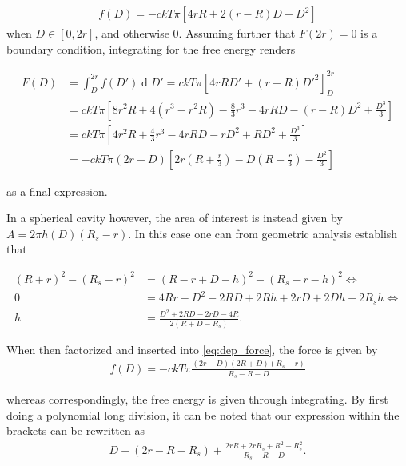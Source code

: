 \documentclass[a4paper,12pt]{article}
\renewcommand{\d}[1]{\ensuremath{\operatorname{d}\!{#1}}} %
\theoremstyle{plain}
\theoremstyle{definition}
\begin{document}
   \begin{align}
      f(D) = -ckT\pi \left[ 4rR + 2(r-R)D - D^2 \right] 
   \end{align}
   when $D \in [0, 2r]$, and otherwise 0. Assuming further that $F(2r) = 0$ is a
   boundary condition, integrating for the free energy renders

   \begin{align}
      F(D) &= \int_D^{2r} f(D') \d D' = ckT\pi\left[ 4rRD' + (r-R)D'^2 
      \right]_D^{2r} \nonumber \\
      &= ckT\pi\left[ 8r^2R + 4(r^3-r^2R) - \frac{8}{3}r^3 - 4rRD
      - (r-R) D^2 + \frac{D^3}{3}\right] \nonumber \\
      &= ckT\pi\left[ 4r^2R +
      \frac{4}{3}r^3 - 4rRD - rD^2 + RD^2 + \frac{D^3}{3}\right] \nonumber \\
      &= -ckT\pi(2r-D)\left[
      2r\left( R +\frac{r}{3} \right) - D\left( R - \frac{r}{3}\right) -
      \frac{D^2}{3} 
      \right]
      \label{eq:free_en}
   \end{align}
   
   as a final expression.

   In a spherical cavity however, the area of interest is instead given by
   $A = 2\pi h(D)(R_s - r)$. In this case one can from geometric analysis
   establish that 

   \begin{align*}
      (R + r)^2- (R_s -r)^2 &= (R -r +D - h)^2 - (R_s -r - h)^2 \Leftrightarrow \\
      0 &= 4Rr - D^2 - 2RD + 2Rh + 2rD + 2Dh - 2R_sh \Leftrightarrow \\
      h &= \frac{D^2 + 2RD - 2rD - 4R}{2(R + D - R_s)}.
   \end{align*}

   When then factorized and inserted into \cref{eq:dep_force}, the force is
   given by 
   \begin{align}
   f(D) = -ckT\pi \frac{(2r-D)(2R+D)(R_s-r)}{R_s - R - D}
      \label{eq:force_spherical_cav}
   \end{align}
   
   whereas correspondingly, the free energy is given through integrating. By
   first doing a polynomial long division, it can be noted that our expression
   within the brackets can be rewritten as 
   \begin{align*}
      D - (2r-R-R_s) + \frac{2rR + 2rR_s + R^2-R_s^2}{R_s - R - D}.
   \end{align*}
\end{document}
